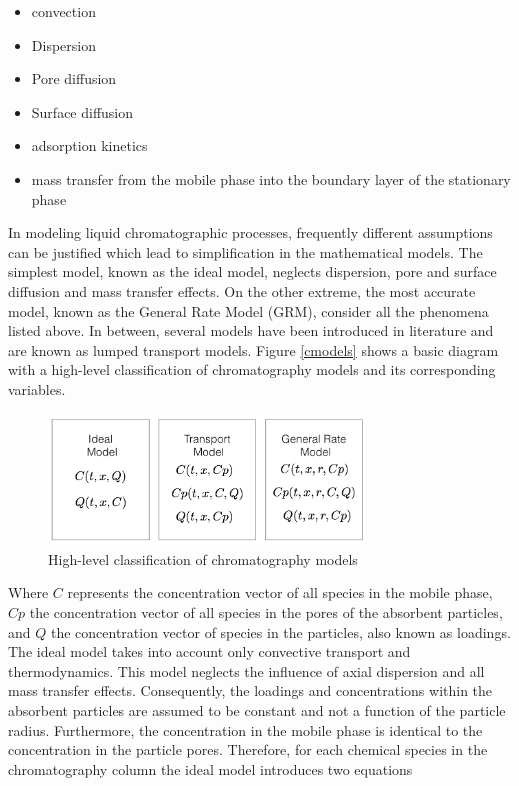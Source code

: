 \documentclass[paper=a4, fontsize=11pt]{scrartcl}
\begin{document}
\begin{itemize}
\item convection
\item Dispersion
\item Pore diffusion
\item Surface diffusion
\item adsorption kinetics
\item mass transfer from the mobile phase into the boundary layer of the stationary phase
\end{itemize}

In modeling liquid chromatographic processes, frequently different assumptions can be justified which lead to simplification in the mathematical models. The simplest model, known as the ideal model, neglects dispersion, pore and surface diffusion and mass transfer effects. On the other extreme, the most accurate model, known as the General Rate Model (GRM), consider all the phenomena listed above. In between, several models have been introduced in literature and are known as lumped transport models. Figure \eqref{cmodels} shows a basic diagram with a high-level classification of chromatography models and its corresponding variables.

\begin{figure}[h]
\centering
\label{cmodels}
\includegraphics[width=0.75\textwidth]{models.png}
\caption{High-level classification of chromatography models}
\end{figure}

Where $C$ represents the concentration vector of all species in the mobile phase, $Cp$ the concentration vector of all species in the pores of the absorbent particles, and $Q$ the concentration vector of species in the particles, also known as loadings. The ideal model takes into account only convective transport and thermodynamics. This model neglects the influence of axial dispersion and all mass transfer effects. Consequently, the loadings and concentrations within the absorbent particles are assumed to be constant and not a function of the particle radius. Furthermore, the concentration in the mobile phase is identical to the concentration in the particle pores. Therefore, for each chemical species in the chromatography column the ideal model introduces two equations
\end{document}
